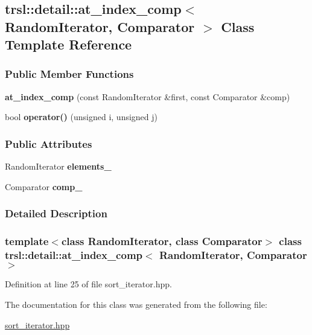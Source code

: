 \hypertarget{classtrsl_1_1detail_1_1at__index__comp}{
\subsection{trsl::detail::at\_\-index\_\-comp$<$ RandomIterator, Comparator $>$ Class Template Reference}
\label{classtrsl_1_1detail_1_1at__index__comp}
}
\subsubsection*{Public Member Functions}
\begin{DoxyCompactItemize}
\item 
\hypertarget{classtrsl_1_1detail_1_1at__index__comp_a38d6ad7b9d88a7c0d98cf724354c3315}{
{\bfseries at\_\-index\_\-comp} (const RandomIterator \&first, const Comparator \&comp)}
\label{classtrsl_1_1detail_1_1at__index__comp_a38d6ad7b9d88a7c0d98cf724354c3315}

\item 
\hypertarget{classtrsl_1_1detail_1_1at__index__comp_a1ab60db35210375aa8c3964a16079266}{
bool {\bfseries operator()} (unsigned i, unsigned j)}
\label{classtrsl_1_1detail_1_1at__index__comp_a1ab60db35210375aa8c3964a16079266}

\end{DoxyCompactItemize}
\subsubsection*{Public Attributes}
\begin{DoxyCompactItemize}
\item 
\hypertarget{classtrsl_1_1detail_1_1at__index__comp_ac8a512d66581030bd579a9000d65fe25}{
RandomIterator {\bfseries elements\_\-}}
\label{classtrsl_1_1detail_1_1at__index__comp_ac8a512d66581030bd579a9000d65fe25}

\item 
\hypertarget{classtrsl_1_1detail_1_1at__index__comp_a945bf0d6440d85082d06b8145cb74ea8}{
Comparator {\bfseries comp\_\-}}
\label{classtrsl_1_1detail_1_1at__index__comp_a945bf0d6440d85082d06b8145cb74ea8}

\end{DoxyCompactItemize}


\subsubsection{Detailed Description}
\subsubsection*{template$<$class RandomIterator, class Comparator$>$ class trsl::detail::at\_\-index\_\-comp$<$ RandomIterator, Comparator $>$}



Definition at line 25 of file sort\_\-iterator.hpp.

The documentation for this class was generated from the following file:\begin{DoxyCompactItemize}
\item 
\hyperlink{sort__iterator_8hpp}{sort\_\-iterator.hpp}\end{DoxyCompactItemize}
